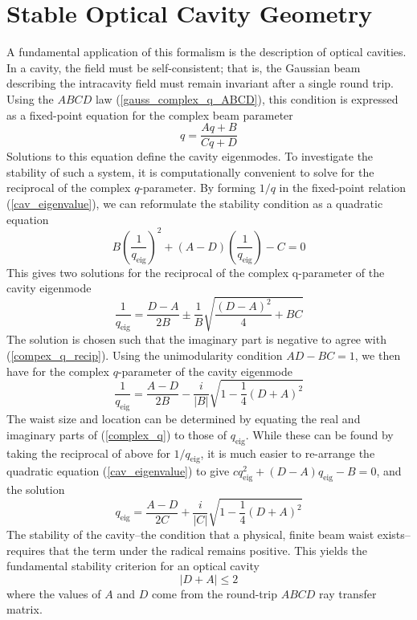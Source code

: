 \section{Stable Optical Cavity Geometry}
A fundamental application of this formalism is the description of optical cavities. In a cavity, the field must be self-consistent; that is, the Gaussian beam describing the intracavity field must remain invariant after a single round trip. Using the $ABCD$ law (\ref{gauss_complex_q_ABCD}), this condition is expressed as a fixed-point equation for the complex beam parameter
\begin{equation} \label{cav_eigenvalue}
	q = \frac{Aq + B}{Cq + D}
\end{equation}
Solutions to this equation define the cavity eigenmodes. To investigate the stability of such a system, it is computationally convenient to solve for the reciprocal of the complex $q$-parameter. By forming $1/q$ in the fixed-point relation (\ref{cav_eigenvalue}), we can reformulate the stability condition as a quadratic equation
\begin{equation}
	B\left(\frac{1}{q_\mathrm{eig}}\right)^2 + (A-D)\left(\frac{1}{q_\mathrm{eig}}\right) - C = 0
\end{equation}
This gives two solutions for the reciprocal of the complex q-parameter of the cavity eigenmode
\begin{equation}
	\frac{1}{q_\mathrm{eig}} = \frac{D-A}{2B} \pm \frac{1}{B}\sqrt{\frac{(D-A)^2}{4} + BC}
\end{equation}
The solution is chosen such that the imaginary part is negative to agree with (\ref{compex_q_recip}). Using the unimodularity condition $AD - BC = 1$, we then have for the complex $q$-parameter of the cavity eigenmode
\begin{equation} \label{cavity_eigenmode_recip}
	\frac{1}{q_\mathrm{eig}} = \frac{A-D}{2B} - \frac{i}{|B|}\sqrt{1 - \frac{1}{4}\left(D + A\right)^2}
\end{equation}
The waist size and location can be determined by equating the real and imaginary parts of (\ref{complex_q}) to those of $q_\mathrm{eig}$. While these can be found by taking the reciprocal of above for $1/q_\mathrm{eig}$, it is much easier to re-arrange the quadratic equation (\ref{cav_eigenvalue}) to give $cq_\mathrm{eig}^2 + (D-A)q_\mathrm{eig} -B = 0$, and the solution
\begin{equation}\label{cavity_eigenmode}
	q_\mathrm{eig} = \frac{A-D}{2C} + \frac{i}{|C|}\sqrt{1-\frac{1}{4}(D+A)^2}
\end{equation}
The stability of the cavity--the condition that a physical, finite beam waist exists--requires that the term under the radical remains positive. This yields the fundamental stability criterion for an optical cavity
\begin{equation} \label{cavity_stab_condition}
	\left|D+A\right| \leq 2
\end{equation}
where the values of $A$ and $D$ come from the round-trip $ABCD$ ray transfer matrix.

